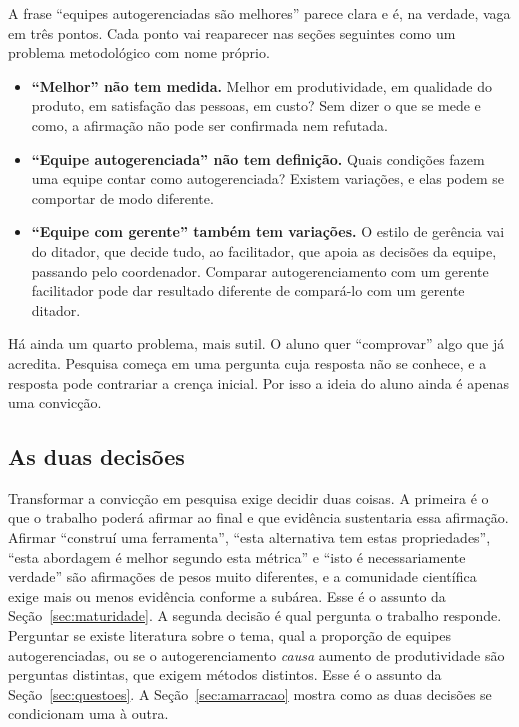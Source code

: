 \documentclass[10pt,a4paper]{extarticle}
\theoremstyle{definition}
\begin{document}
A frase \enquote{equipes autogerenciadas são melhores} parece clara e é, na verdade, vaga em três pontos. Cada ponto vai reaparecer nas seções seguintes como um problema metodológico com nome próprio.
\begin{itemize}
  \item \textbf{\enquote{Melhor} não tem medida.} Melhor em produtividade, em qualidade do produto, em satisfação das pessoas, em custo? Sem dizer o que se mede e como, a afirmação não pode ser confirmada nem refutada.
  \item \textbf{\enquote{Equipe autogerenciada} não tem definição.} Quais condições fazem uma equipe contar como autogerenciada? Existem variações, e elas podem se comportar de modo diferente.
  \item \textbf{\enquote{Equipe com gerente} também tem variações.} O estilo de gerência vai do ditador, que decide tudo, ao facilitador, que apoia as decisões da equipe, passando pelo coordenador. Comparar autogerenciamento com um gerente facilitador pode dar resultado diferente de compará-lo com um gerente ditador.
\end{itemize}

Há ainda um quarto problema, mais sutil. O aluno quer \enquote{comprovar} algo que já acredita. Pesquisa começa em uma pergunta cuja resposta não se conhece, e a resposta pode contrariar a crença inicial. Por isso a ideia do aluno ainda é apenas uma convicção.

\subsection{As duas decisões}

Transformar a convicção em pesquisa exige decidir duas coisas. A primeira é o que o trabalho poderá afirmar ao final e que evidência sustentaria essa afirmação. Afirmar \enquote{construí uma ferramenta}, \enquote{esta alternativa tem estas propriedades}, \enquote{esta abordagem é melhor segundo esta métrica} e \enquote{isto é necessariamente verdade} são afirmações de pesos muito diferentes, e a comunidade científica exige mais ou menos evidência conforme a subárea. Esse é o assunto da Seção~\ref{sec:maturidade}. A segunda decisão é qual pergunta o trabalho responde. Perguntar se existe literatura sobre o tema, qual a proporção de equipes autogerenciadas, ou se o autogerenciamento \emph{causa} aumento de produtividade são perguntas distintas, que exigem métodos distintos. Esse é o assunto da Seção~\ref{sec:questoes}. A Seção~\ref{sec:amarracao} mostra como as duas decisões se condicionam uma à outra.
\end{document}
